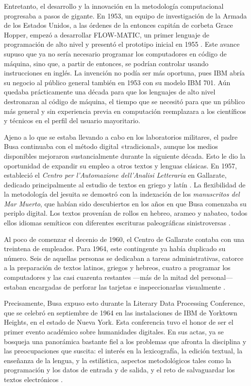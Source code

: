 Entretanto, el desarrollo y la innovación en la metodología computacional progresaba a pasos de gigante. En 1953, un equipo de investigación de la Armada de los Estados Unidos, a las órdenes de la entonces capitán de corbeta Grace Hopper, empezó a desarrollar FLOW-MATIC, un primer lenguaje de programación de alto nivel y presentó el prototipo inicial en 1955 \parencite{hopper1978}. Este avance supuso que ya no sería necesario programar los computadores en código de máquina, sino que, a partir de entonces, se podrían controlar usando instrucciones en inglés. La invención no podía ser más oportuna, pues IBM abría su negocio al público general también en 1953 con su modelo IBM 701. Aún quedaba prácticamente una década para que los lenguajes de alto nivel destronaran al código de máquina, el tiempo que se necesitó para que un público más general y sin experiencia previa en computación reemplazara a los científicos y técnicos en el perfil del usuario mayoritario.

Ajeno a lo que se estaba llevando a cabo en los laboratorios militares, el padre Busa continuaba con el método digital «tradicional», aunque los medios disponibles mejoraron sustancialmente durante la siguiente década. Esto le dio la oportunidad de expandir su empleo a otros textos y lenguas clásicas. En 1957, estableció el \textit{Centro per l'Automazione dell'Analisi Letteraria} en Gallarate, dedicado principalmente al estudio de textos en griego y latín \parencite[3]{burton1981}. La flexibilidad de la metodología del jesuita se demostró con la indexación de los \textit{manuscritos del Mar Muerto}, que habían sido descubiertos en los años en que Busa comenzaba su periplo digital. Los textos provenían de rollos en hebreo, arameo y nabateo, todos ellos idiomas semíticos con diferentes escrituras paleográficas sinistroversas \parencite{busa1958}. 

Al poco de comenzar el decenio de 1960, el Centro de Gallarate contaba con una treintena de empleados. Para 1964, este contingente ya había duplicado su número. Seis de aquellas personas se dedicaban a tareas administrativas, catorce a la preparación de textos latinos, griegos y hebreos, cuatro a programar los computadores y las casi cuarenta restantes —más de la mitad del personal— estaban encargadas de perforar las tarjetas e inspeccionarlas visualmente \parencite{busa1965}.

Precisamente, Busa expuso esto durante la Literary Data Processing Conference, que se celebró en septiembre de 1964 en las instalaciones de IBM de Yorktown Heights, en el estado de Nueva York. Esta conferencia tuvo el honor de ser el primer evento académico sobre humanidades digitales. En sus actas, ya se bosqueja una panorámica bastante fiel a los problemas que afronta la disciplina y las preocupaciones que suscita: el interés en la lexicografía, la edición textual, la enseñanza de la lengua, y la estilística, aspectos metodológicos tales como la programación y los datos de entrada y de salida, y el reto de salvaguardar los textos electrónicos \parencite[7]{hockey2004}.

